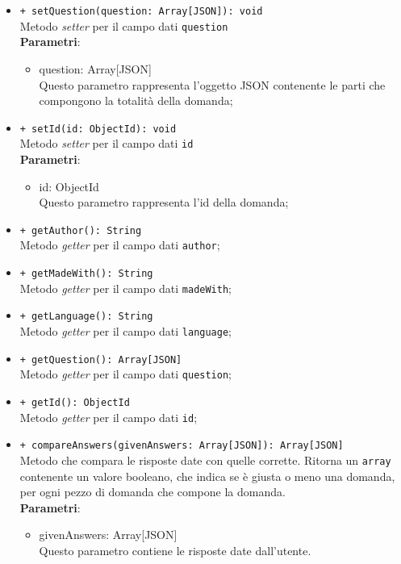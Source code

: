 \begin{itemize}
\begin{itemize}
				\item \texttt{+ setQuestion(question: Array[JSON]): void} \\
				Metodo \textit{setter} per il campo dati \texttt{question}\\
				\textbf{Parametri}:
				\begin{itemize}
					\item {question: Array[JSON]}\\
					Questo parametro rappresenta l'oggetto JSON contenente le parti che compongono la totalità della domanda;
				\end{itemize}
				
				\item \texttt{+ setId(id: ObjectId): void} \\
				Metodo \textit{setter} per il campo dati \texttt{id}\\
				\textbf{Parametri}:
				\begin{itemize}
					\item {id: ObjectId}\\
					Questo parametro rappresenta l'id della domanda;
				\end{itemize}
				
				\item \texttt{+ getAuthor(): String} \\
				Metodo \textit{getter} per il campo dati \texttt{author};
				
				\item \texttt{+ getMadeWith(): String} \\
				Metodo \textit{getter} per il campo dati \texttt{madeWith};
				
				\item \texttt{+ getLanguage(): String} \\
				Metodo \textit{getter} per il campo dati \texttt{language};

				\item \texttt{+ getQuestion(): Array[JSON]} \\
				Metodo \textit{getter} per il campo dati \texttt{question};
				
				\item \texttt{+ getId(): ObjectId} \\
				Metodo \textit{getter} per il campo dati \texttt{id};
				
				\item \texttt{+ compareAnswers(givenAnswers: Array[JSON]): Array[JSON]} \\
				Metodo che compara le risposte date con quelle corrette. Ritorna un \texttt{array} contenente un valore booleano, che indica se è giusta o meno una domanda, per ogni pezzo di domanda che compone la domanda. \\
				\textbf{Parametri}:
				\begin{itemize}
					\item {givenAnswers: Array[JSON]}\\
					Questo parametro contiene le risposte date dall'utente. 
				\end{itemize}
				

\end{itemize}
\end{itemize}
